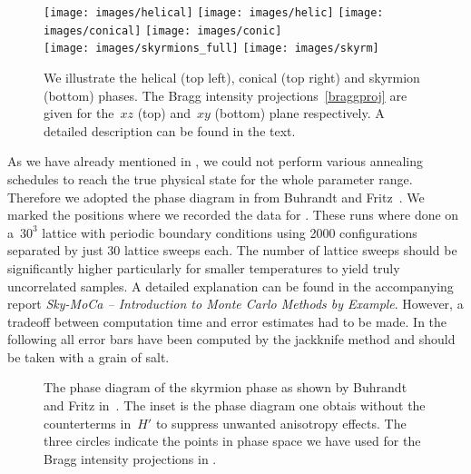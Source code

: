 \begin{figure}[H]
  \centering
  \texttt{[image: images/helical]}
  \hspace{0.5cm}
  \texttt{[image: images/helic]}
  \hfill
  \texttt{[image: images/conical]}
  \hspace{0.5cm}
  \texttt{[image: images/conic]}\\
  \vspace{1.5cm}
  \texttt{[image: images/skyrmions\_full]}
  \hspace{1cm}
  \texttt{[image: images/skyrm]}
  \caption{We illustrate the helical (top left), conical (top right) and
  skyrmion (bottom) phases. The Bragg intensity projections~\eqref{braggproj}
  are given for the~$xz$ (top) and~$xy$ (bottom) plane respectively. A detailed
  description can be found in the text.}
\label{fig:phases}
\end{figure}

As we have already mentioned in , we could not perform
various annealing schedules to reach the true physical state for the whole
parameter range. Therefore we adopted the phase diagram in 
from Buhrandt and Fritz~\cite{skyrmion}. We marked the positions where we
recorded the data for . These runs where done on a~$30^3$
lattice with periodic boundary conditions using 2000 configurations separated by
just 30 lattice sweeps each. The number of lattice sweeps should be
significantly higher particularly for smaller temperatures to yield truly
uncorrelated samples. A detailed explanation can be found in the accompanying
report \emph{Sky-MoCa -- Introduction to Monte Carlo Methods by Example}.
However, a tradeoff between computation time and error estimates had to be made.
In the following all error bars have been computed by the jackknife method and
should be taken with a grain of salt.

\begin{figure}[H]
  \centering
  \caption{The phase diagram of the skyrmion phase as shown by Buhrandt and
  Fritz in~\cite{skyrmion}. The inset is the phase diagram one obtais without
  the counterterms in~$H'$ to suppress unwanted anisotropy effects. The three
  circles indicate the points in phase space we have used for the Bragg
  intensity projections in .}
\label{fig:diagram}
\end{figure}
%

